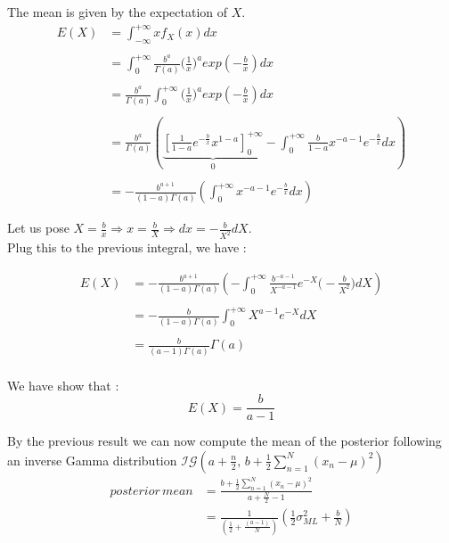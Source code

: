 \documentclass[12pt,twoside]{article}
\begin{document}
The mean is given by the expectation of $X$.
\begin{align*}
E(X) &= \int_{-\infty}^{+\infty} x  f_X(x) dx \\ \\
     &= \int_{0}^{+\infty} \frac{b^a}{\Gamma(a)} \big(\frac{1}{x}\big)^{a}exp(-\frac{b}{x}) dx \\\\
     &= \frac{b^a}{\Gamma(a)} \int_{0}^{+\infty}  \big(\frac{1}{x}\big)^{a}exp(-\frac{b}{x}) dx \\\\
     &= \frac{b^a}{\Gamma(a)} \left( \underbrace{\left[\frac{1}{1 - a}e^{-\frac{b}{x}}x^{1- a}\right]^{+\infty}_{0}}_0 - \int_{0}^{+\infty} \frac{b}{1-a} x^{-a-1}e^{-\frac{b}{x}} dx\right) \\ \\
     &= -\frac{b^{a+1}}{(1-a)\Gamma(a)} \left(\int_{0}^{+\infty}  x^{-a-1}e^{-\frac{b}{x}} dx\right)
\end{align*}

Let us pose $X = \frac{b}{x} \Longrightarrow x = \frac{b}{X} \Longrightarrow dx = -\frac{b}{X^2} dX$.\\
Plug this to the previous integral, we have : 

\begin{align*}
E(X) &= -\frac{b^{a+1}}{(1-a)\Gamma(a)} \left( - \int_{0}^{+\infty}  \frac{b^{-a-1}}{X^{-a-1}} e^{-X} \big(-\frac{b}{X^2}\big)dX\right) \\ \\
     &= -\frac{b}{(1-a)\Gamma(a)} \int_{0}^{+\infty} X^{a-1} e^{-X}dX\\\\
     &= \frac{b}{(a-1)\Gamma(a)}\Gamma(a) \\
\end{align*}

We have show that :
\begin{equation*}
\boxed{E(X) = \frac{b}{a-1}}
\end{equation*}

By the previous result we can now compute the mean of the posterior following an inverse Gamma distribution $\mathcal{IG}\left(a+\frac{n}{2},  \,b + \frac{1}{2}\sum_{n=1}^{N} (x_n - \mu)^2 \right)$\\

\begin{align*}
posterior\, mean &= \frac{b + \frac{1}{2}\sum_{n=1}^{N} (x_n - \mu)^2}{a+\frac{N}{2} - 1} \\
                 &= \frac{1}{\left(\frac{1}{2} + \frac{(a-1)}{N}\right)} \left( \frac{1}{2}\sigma_{ML}^2   + \frac{b}{N}\right)
\end{align*}
\end{document}
